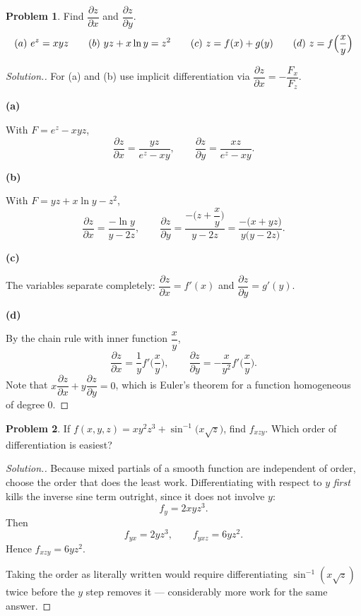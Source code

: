 \documentclass[11pt,a4paper]{article}
\theoremstyle{definition}
\newtheorem{problemx}{Problem}[subsection]
\newenvironment{problem}{\begin{problemx}}{\end{problemx}}
\newenvironment{solution}
  {\renewcommand{\qedsymbol}{}\begin{proof}[\textit{Solution}.]}
  {\end{proof}}
\newcommand{\subhead}[1]{%
  \par\medskip\noindent\textbf{#1}\par\nobreak\smallskip}
\begin{document}
\begin{problem}
Find $\dfrac{\partial z}{\partial x}$ and $\dfrac{\partial z}{\partial y}$.
$$(a)\ e^z = xyz\hspace{0.7cm}(b)\ yz + x\ln y = z^2\hspace{0.7cm}
(c)\ z = f(x)+g(y)\hspace{0.7cm}(d)\ z = f\Big(\frac{x}{y}\Big)$$
\end{problem}
\begin{solution}
For (a) and (b) use implicit differentiation via
$\dfrac{\partial z}{\partial x} = -\dfrac{F_x}{F_z}$.

\subhead{(a)} With $F = e^z-xyz$,
$$\frac{\partial z}{\partial x} = \frac{yz}{e^z-xy},\qquad
\frac{\partial z}{\partial y} = \frac{xz}{e^z-xy}.$$

\subhead{(b)} With $F = yz+x\ln y-z^2$,
$$\frac{\partial z}{\partial x} = \frac{-\ln y}{y-2z},\qquad
\frac{\partial z}{\partial y} = \frac{-\Big(z+\dfrac{x}{y}\Big)}{y-2z}
= \frac{-\big(x+yz\big)}{y\big(y-2z\big)}.$$

\subhead{(c)} The variables separate completely:
$\dfrac{\partial z}{\partial x} = f'(x)$ and
$\dfrac{\partial z}{\partial y} = g'(y)$.

\subhead{(d)} By the chain rule with inner function $\dfrac{x}{y}$,
$$\frac{\partial z}{\partial x} = \frac{1}{y}f'\Big(\frac xy\Big),\qquad
\frac{\partial z}{\partial y} = -\frac{x}{y^2}f'\Big(\frac xy\Big).$$
Note that $x\dfrac{\partial z}{\partial x} + y\dfrac{\partial z}{\partial y} = 0$,
which is Euler's theorem for a function homogeneous of degree $0$.
\end{solution}

\begin{problem}
If $f(x,y,z) = xy^2z^3 + \sin^{-1}\big(x\sqrt z\big)$, find $f_{xzy}$. Which
order of differentiation is easiest?
\end{problem}
\begin{solution}
Because mixed partials of a smooth function are independent of order, choose the
order that does the least work. Differentiating with respect to $y$ \emph{first}
kills the inverse sine term outright, since it does not involve $y$:
$$f_y = 2xyz^3 .$$
Then
$$f_{yx} = 2yz^3,\qquad f_{yxz} = 6yz^2 .$$
Hence $f_{xzy} = 6yz^2$.

Taking the order as literally written would require differentiating
$\sin^{-1}(x\sqrt z)$ twice before the $y$ step removes it --- considerably more
work for the same answer.
\end{solution}
\end{document}
